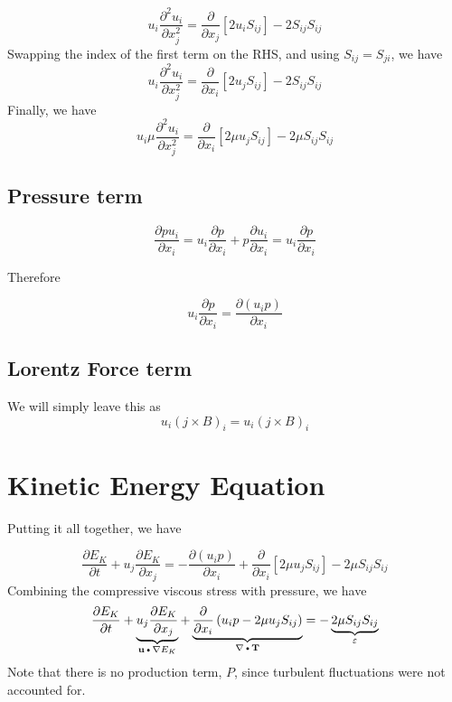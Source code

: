 \documentclass[11pt]{article}
\newcommand{\PD}{\partial}
\newcommand{\U}{\mathbf{u}}
\newcommand{\DOT}{\text{\textbullet}}
\begin{document}
\begin{equation}
	u_i \frac{\PD^2 u_i}{\PD x_j^2} = 
	\frac{\PD}{\PD x_j} \left[ 2 u_i S_{ij} \right] - 
	2 S_{ij} S_{ij}
\end{equation}
Swapping the index of the first term on the RHS, and using $S_{ij}=S_{ji}$, we have
\begin{equation}
	u_i \frac{\PD^2 u_i}{\PD x_j^2} = 
	\frac{\PD}{\PD x_i} \left[ 2 u_j S_{ij} \right] - 
	2 S_{ij} S_{ij}
\end{equation}
Finally, we have
\begin{equation}
	\boxed{
	u_i \mu \frac{\PD^2 u_i}{\PD x_j^2} = 
	\frac{\PD}{\PD x_i} \left[ 2 \mu u_j S_{ij} \right] - 
	2 \mu S_{ij} S_{ij}
	}
\end{equation}


\subsection{Pressure term}
\begin{equation}
	\frac{\PD p u_i}{\PD x_i}
	=
	u_i \frac{\PD p}{\PD x_i}
	+
	p \frac{\PD u_i}{\PD x_i}
	=
	u_i \frac{\PD p}{\PD x_i}
\end{equation}

Therefore

\begin{equation}
	\boxed{
	u_i \frac{\PD p}{\PD x_i} =
	\frac{\PD (u_i p)}{\PD x_i}
	}
\end{equation}

\subsection{Lorentz Force term}
We will simply leave this as
\begin{equation}
	\boxed{
	u_i (j \times B)_i = u_i (j \times B)_i
	}
\end{equation}

\section{Kinetic Energy Equation}
Putting it all together, we have

\begin{equation}
	\frac{\PD E_K}{\PD t} + 
	u_j \frac{\PD E_K}{\PD x_j} = 
	- \frac{\PD (u_i p)}{\PD x_i} + 
	\frac{\PD}{\PD x_i} \left[ 2 \mu u_j S_{ij} \right] - 
	2 \mu S_{ij} S_{ij}
\end{equation}
Combining the compressive viscous stress with pressure, we have
\begin{equation}
	\frac{\PD E_K}{\PD t} + 
	\underbrace{u_j \frac{\PD E_K}{\PD x_j}}_{\U \DOT \nabla E_K} +
	\underbrace{\frac{\PD}{\PD x_i} \left( u_i p - 2 \mu u_j S_{ij} \right)}_{\nabla \DOT \mathbf{T}} = 
	- \underbrace{2 \mu S_{ij} S_{ij}}_{\varepsilon}
\end{equation}
Note that there is no production term, $P$, since turbulent fluctuations were not accounted for.
\end{document}
